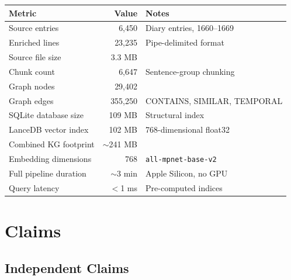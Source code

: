 \documentclass[12pt,letterpaper]{article}
\begin{document}
\vspace{6pt}
\begin{center}
\begin{tabular}{lrl}
  \toprule
  \textbf{Metric} & \textbf{Value} & \textbf{Notes} \\
  \midrule
  Source entries          & 6,450     & Diary entries, 1660--1669 \\
  Enriched lines          & 23,235    & Pipe-delimited format \\
  Source file size        & 3.3 MB    & \\
  Chunk count             & 6,647     & Sentence-group chunking \\
  Graph nodes             & 29,402    & \\
  Graph edges             & 355,250   & CONTAINS, SIMILAR, TEMPORAL \\
  SQLite database size    & 109 MB    & Structural index \\
  LanceDB vector index    & 102 MB    & 768-dimensional float32 \\
  Combined KG footprint   & $\sim$241 MB & \\
  Embedding dimensions    & 768       & \texttt{all-mpnet-base-v2} \\
  Full pipeline duration  & $\sim$3 min & Apple Silicon, no GPU \\
  Query latency           & $<$1 ms   & Pre-computed indices \\
  \bottomrule
\end{tabular}
\end{center}

\section*{Claims}

\subsection*{Independent Claims}
\end{document}
